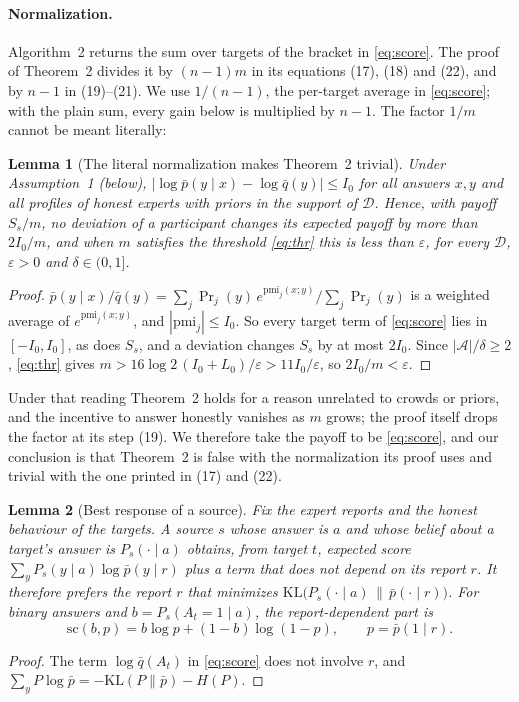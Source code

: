 \documentclass[11pt]{article}
\newtheorem{lemma}{Lemma}
\theoremstyle{remark}
\newcommand{\cD}{\mathcal{D}}
\newcommand{\cA}{\mathcal{A}}
\newcommand{\pb}{\bar p}
\newcommand{\qb}{\bar q}
\begin{document}
\paragraph{Normalization.} Algorithm~2 returns the sum over targets of the bracket in \eqref{eq:score}. The proof of Theorem~2 divides it by $(n-1)m$ in its equations (17), (18) and (22), and by $n-1$ in (19)--(21). We use $1/(n-1)$, the per-target average in \eqref{eq:score}; with the plain sum, every gain below is multiplied by $n-1$. The factor $1/m$ cannot be meant literally:

\begin{lemma}[The literal normalization makes Theorem~2 trivial]\label{lem:triv}
Under Assumption~1 (below), $|\log\pb(y\mid x)-\log\qb(y)|\le I_0$ for all answers $x,y$ and all profiles of honest experts with priors in the support of $\cD$. Hence, with payoff $S_s/m$, no deviation of a participant changes its expected payoff by more than $2I_0/m$, and when $m$ satisfies the threshold \eqref{eq:thr} this is less than $\varepsilon$, for every $\cD$, $\varepsilon>0$ and $\delta\in(0,1]$.
\end{lemma}
\begin{proof}
$\pb(y\mid x)/\qb(y)=\sum_j\Pr_j(y)\,e^{\mathrm{pmi}_j(x;y)}\big/\sum_j\Pr_j(y)$ is a weighted average of $e^{\mathrm{pmi}_j(x;y)}$, and $|\mathrm{pmi}_j|\le I_0$. So every target term of \eqref{eq:score} lies in $[-I_0,I_0]$, as does $S_s$, and a deviation changes $S_s$ by at most $2I_0$. Since $|\cA|/\delta\ge2$, \eqref{eq:thr} gives $m>16\log 2\,(I_0+L_0)/\varepsilon>11I_0/\varepsilon$, so $2I_0/m<\varepsilon$.
\end{proof}

Under that reading Theorem~2 holds for a reason unrelated to crowds or priors, and the incentive to answer honestly vanishes as $m$ grows; the proof itself drops the factor at its step (19). We therefore take the payoff to be \eqref{eq:score}, and our conclusion is that Theorem~2 is false with the normalization its proof uses and trivial with the one printed in (17) and (22).

\begin{lemma}[Best response of a source]\label{lem:br}
Fix the expert reports and the honest behaviour of the targets. A source $s$ whose answer is $a$ and whose belief about a target's answer is $P_s(\cdot\mid a)$ obtains, from target $t$, expected score $\sum_y P_s(y\mid a)\log\pb(y\mid r)$ plus a term that does not depend on its report $r$. It therefore prefers the report $r$ that minimizes $\mathrm{KL}\big(P_s(\cdot\mid a)\,\|\,\pb(\cdot\mid r)\big)$. For binary answers and $b=P_s(A_t{=}1\mid a)$, the report-dependent part is
\begin{equation}
\mathrm{sc}(b,p)=b\log p+(1-b)\log(1-p),\qquad p=\pb(1\mid r).\label{eq:sc}
\end{equation}
\end{lemma}
\begin{proof}
The term $\log\qb(A_t)$ in \eqref{eq:score} does not involve $r$, and $\sum_yP\log\pb=-\mathrm{KL}(P\|\pb)-H(P)$.
\end{proof}
\end{document}
